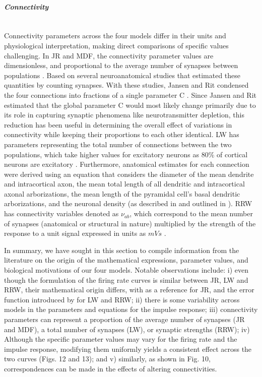 \documentclass[12pt,twoside]{article}
\begin{document}
\paragraph{\textit{Connectivity}}~\\
Connectivity parameters across the four models differ in their units and physiological interpretation, making direct comparisons of specific values challenging. In JR and MDF, the connectivity parameter values are dimensionless, and proportional to the average number of synapses between populations \citep{jansen1995electroencephalogram}. Based on several neuroanatomical studies \citep{braitenberg2013cortex, larkman1991dendritic, liu1991distribution, elhanany1990intrinsic} that estimated these quantities by counting synapses. With these studies, Jansen and Rit condensed the four connections into fractions of a single parameter C \citep{grimbert2006bifurcation}. Since Jansen and Rit estimated that the global parameter C would most likely change primarily due to its role in capturing synaptic phenomena like neurotransmitter depletion, this reduction has been useful in determining the overall effect of variations in connectivity while keeping their proportions to each other identical. LW has parameters representing the total number of connections between the two populations, which take higher values for excitatory neurons as 80\% of cortical neurons are excitatory \citep{cook2021neural}. Furthermore, anatomical estimates for each connection were derived using an equation that considers the diameter of the mean dendrite and intracortical axon, the mean total length of all dendritic and intracortical axonal arborizations, the mean length of the pyramidal cell's basal dendritic arborizations, and the neuronal density (as described in \citealp{liley2001spatially} and outlined in \citealp{liley1994intracortical}). RRW has connectivity variables denoted as $\nu_{ab}$, which correspond to the mean number of synapses (anatomical or structural in nature) multiplied by the strength of the response to a unit signal expressed in units as $mVs$ \citep{rennie1999effects, robinson1997propagation, rall1967distinguishing}. 
 

In summary, we have sought in this section to compile information from the literature on the origin of the mathematical expressions, parameter values, and  biological motivations of our four models. Notable observations include: i) even though the formulation of the firing rate curves is similar between JR, LW and RRW, their mathematical origin differs, with \citet{da1976models} as a reference for JR, and the error function introduced by \citet{wright1995simulation} for LW and RRW; ii) there is some variability across models in the parameters and equations for the impulse response; iii) connectivity parameters can represent a proportion of the average number of synapses (JR and MDF), a total number of synapses (LW), or synaptic strengths (RRW); iv) Although the specific parameter values may vary for the firing rate and the impulse response, modifying them uniformly yields a consistent effect across the two curves (Figs. 12 and 13); and v) similarly, as shown in Fig. 10, correspondences can be made in the effects of altering connectivities.
\end{document}
